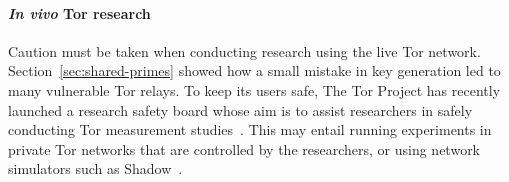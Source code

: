 \paragraph{\textit{In vivo} Tor research}
Caution must be taken when conducting research using the live Tor network.
Section~\ref{sec:shared-primes} showed how a small mistake in key generation led
to many vulnerable Tor relays.  To keep its users safe, The Tor Project has
recently launched a research safety board whose aim is to assist researchers in
safely conducting Tor measurement studies~\cite{safety-board}.  This may entail
running experiments in private Tor networks that are controlled by the
researchers, or using network simulators such as Shadow~\cite{stem}.
